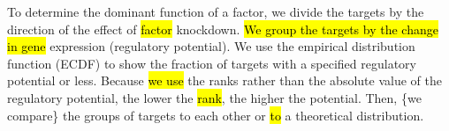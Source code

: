 \documentclass[9pt,a4paper,]{extarticle}
\newenvironment{Shaded}{\begin{snugshade}}{\end{snugshade}}
\newcommand{\AttributeTok}[1]{\textcolor[rgb]{0.77,0.63,0.00}{#1}}
\newcommand{\CommentTok}[1]{\textcolor[rgb]{0.56,0.35,0.01}{\textit{#1}}}
\newcommand{\DecValTok}[1]{\textcolor[rgb]{0.00,0.00,0.81}{#1}}
\newcommand{\FunctionTok}[1]{\textcolor[rgb]{0.00,0.00,0.00}{#1}}
\newcommand{\NormalTok}[1]{#1}
\newcommand{\OtherTok}[1]{\textcolor[rgb]{0.56,0.35,0.01}{#1}}
\newcommand{\SpecialCharTok}[1]{\textcolor[rgb]{0.00,0.00,0.00}{#1}}
\newcommand{\StringTok}[1]{\textcolor[rgb]{0.31,0.60,0.02}{#1}}
\begin{document}
To determine the dominant function of a factor, we divide the targets by the direction of the effect of \hl{factor} knockdown. \hl{We group the targets by the change in gene} expression (regulatory potential). We use the empirical distribution function (ECDF) to show the fraction of targets with a specified regulatory potential or less. Because \hl{we use} the ranks rather than the absolute value of the regulatory potential, the lower the \hl{rank}, the higher the potential. Then, \{we compare\} the groups of targets to each other or \hl{to} a theoretical distribution.

\begin{Shaded}
\end{Shaded}
\end{document}
